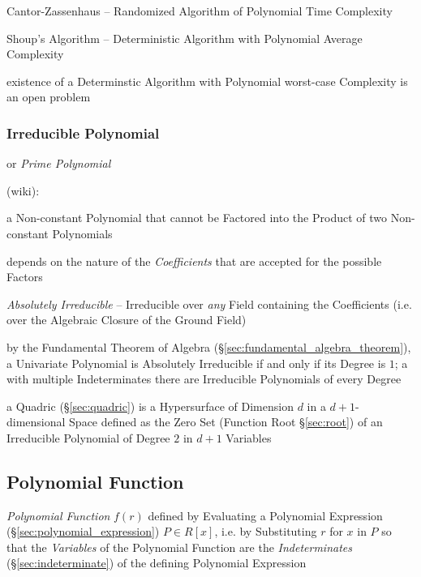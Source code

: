 Cantor-Zassenhaus -- Randomized Algorithm of Polynomial Time Complexity

Shoup's Algorithm -- Deterministic Algorithm with Polynomial Average Complexity

existence of a Determinstic Algorithm with Polynomial worst-case Complexity is
an open problem



\subsubsection{Irreducible Polynomial}\label{sec:irreducible_polynomial}

or \emph{Prime Polynomial}

(wiki):

a Non-constant Polynomial that cannot be Factored into the Product of two
Non-constant Polynomials

depends on the nature of the \emph{Coefficients} that are accepted for the
possible Factors

\emph{Absolutely Irreducible} -- Irreducible over \emph{any} Field containing
the Coefficients (i.e. over the Algebraic Closure of the Ground Field)

by the Fundamental Theorem of Algebra
(\S\ref{sec:fundamental_algebra_theorem}), a Univariate Polynomial is Absolutely
Irreducible if and only if its Degree is $1$; a with multiple Indeterminates
there are Irreducible Polynomials of every Degree

\fist a Quadric (\S\ref{sec:quadric}) is a Hypersurface of Dimension $d$ in a
$d+1$-dimensional Space defined as the Zero Set (Function Root
\S\ref{sec:root}) of an Irreducible Polynomial of Degree $2$ in $d+1$
Variables



\subsection{Polynomial Function}\label{sec:polynomial_function}

\emph{Polynomial Function} $f(r)$ defined by Evaluating a Polynomial Expression
(\S\ref{sec:polynomial_expression}) $P \in R[x]$, i.e. by Substituting $r$ for
$x$ in $P$ so that the \emph{Variables} of the Polynomial Function are the
\emph{Indeterminates} (\S\ref{sec:indeterminate}) of the defining Polynomial
Expression

